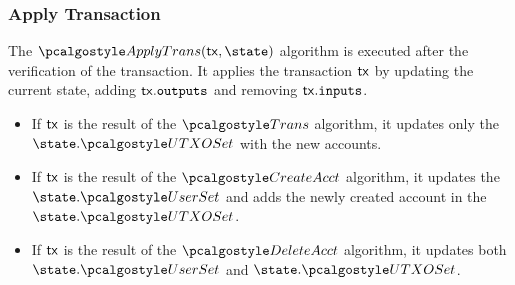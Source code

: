\subsubsection {Apply Transaction}
The $\applytxn (\txn, \state)$ algorithm is executed after the 
verification of the transaction. It applies the transaction $\textup{\textsf{tx}}$ by updating the current state, adding $\textup{\textsf{tx}}.{\textup{\texttt{outputs}}}$ and removing $\textup{\textsf{tx}}.{\textup{\texttt{inputs}}}$.

\begin{itemize}
    \item If $\textup{\textsf{tx}}$ is the result of the $\trans$ algorithm, it updates only the $\state.\utxoset$ with the new accounts. 
    
    

    \item If $\textup{\textsf{tx}}$ is the result of the $\createAcct$ algorithm, it updates the $\state.\usersset$ and adds the newly created account in the $\state.\utxoset$. 
    \item If $\textup{\textsf{tx}}$ is the result of the $\deleteAcct$ algorithm, it updates both $\state.\usersset$ and $\state.\utxoset$.

\end{itemize}

